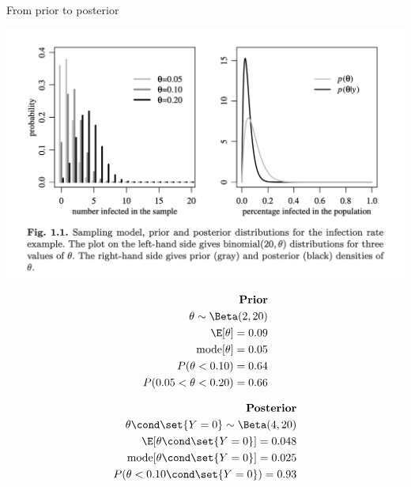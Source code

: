 \documentclass[10pt]{beamer}
\begin{document}
\begin{frame}{From prior to posterior}

\begin{center}
\includegraphics[width=.75\textwidth]{images/hoff_fig1dot1_prior_posterior_shift}
\end{center}

\scriptsize
\begin{minipage}{.45\textwidth}

\begin{align*}
\textbf{Prior} & \\
\theta  \sim  \Beta(2,20)   &\\ 
\E[\theta]  = 0.09 &\\
\text{mode}[\theta] =0.05 &\\
P(\theta < 0.10) = 0.64 &\\
P(0.05 < \theta < 0.20) = 0.66&  \\
\end{align*}

\end{minipage} \hfill
\begin{minipage}{.45\textwidth}

\begin{align*}
\textbf{Posterior} & \\
\theta \cond \set{Y=0}  \sim  \Beta(4,20)  &  \\ 
\E[\theta \cond \set{Y=0}  ] = 0.048& \\
\text{mode}[\theta \cond \set{Y=0}  ] =0.025& \\
P(\theta < 0.10 \cond \set{Y=0} ) = 0.93 &\\
\end{align*}

\end{minipage}


\end{frame}
\end{document}
